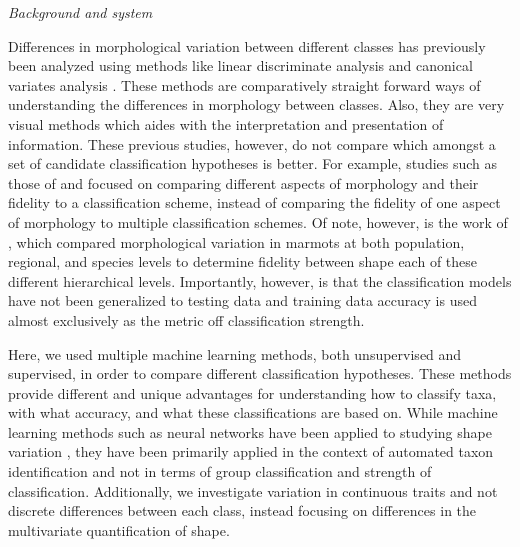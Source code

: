 \documentclass[12pt,letterpaper]{article}\usepackage{graphicx, color}
\renewcommand{\subsection}[1]{%
\bigskip
\begin{center}
\begin{large}
\normalfont\itshape #1
\end{large}
\end{center}}
\begin{document}
\subsection{Background and system}
Differences in morphological variation between different classes has previously been analyzed using methods like linear discriminate analysis and canonical variates analysis \citep{Zelditch2004,Mitteroecker2011,Polly2007a,Polly2003,Gunduz2007,Gaubert2005b,Demandt2009}. These methods are comparatively straight forward ways of understanding the differences in morphology between classes. Also, they are very visual methods which aides with the interpretation and presentation of information. These previous studies, however, do not compare which amongst a set of candidate classification hypotheses is better. For example, studies such as those of \citet{Caumul2005a} and \citet{Polly2007a} focused on comparing different aspects of morphology and their fidelity to a classification scheme, instead of comparing the fidelity of one aspect of morphology to multiple classification schemes. Of note, however, is the work of \citet{Cardini2009a}, which compared morphological variation in marmots at both population, regional, and species levels to determine fidelity between shape each of these different hierarchical levels. Importantly, however, is that the classification models have not been generalized to testing data and training data accuracy is used almost exclusively as the metric off classification strength.

Here, we used multiple machine learning methods, both unsupervised and supervised, in order to compare different classification hypotheses. These methods provide different and unique advantages for understanding how to classify taxa, with what accuracy, and what these classifications are based on. While machine learning methods such as neural networks have been applied to studying shape variation \citep{MacLeod2007}, they have been primarily applied in the context of automated taxon identification and not in terms of group classification and strength of classification. Additionally, we investigate variation in continuous traits and not discrete differences between each class, instead focusing on differences in the multivariate quantification of shape.
\end{document}
